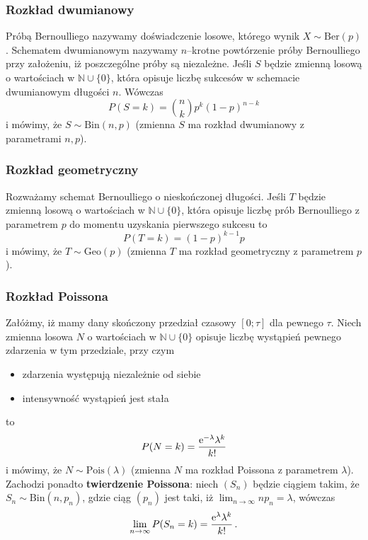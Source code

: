 \documentclass{myclass}
\begin{document}
\subsubsection{Rozkład dwumianowy}
Próbą Bernoulliego nazywamy doświadczenie losowe, którego wynik \(X \sim \text{Ber}(p)\). Schematem
dwumianowym nazywamy \(n\)--krotne powtórzenie próby Bernoulliego przy założeniu, iż poszczególne
próby są niezależne. Jeśli \(S\) będzie zmienną losową o wartościach w \(\mathbb{N} \cup \{0\}\),
która opisuje liczbę sukcesów w schemacie dwumianowym długości \(n\). Wówczas
\begin{equation*}
    P(S = k) = {n \choose k} p^k (1 - p)^{n-k}
\end{equation*}
i mówimy, że \(S \sim \text{Bin}(n, p)\) (zmienna \(S\) ma rozkład dwumianowy z parametrami \(n,
p\)).

\subsubsection{Rozkład geometryczny}
Rozważamy schemat Bernoulliego o nieskończonej długości. Jeśli \(T\) będzie zmienną losową o
wartościach w \(\mathbb{N} \cup \{0\}\), która opisuje liczbę prób Bernoulliego z parametrem \(p\)
do momentu uzyskania pierwszego sukcesu to
\begin{equation*}
    P(T=k) = (1-p)^{k-1}p
\end{equation*}
i mówimy, że \(T \sim \text{Geo}(p)\) (zmienna \(T\) ma rozkład geometryczny z parametrem \(p\)).

\subsubsection{Rozkład Poissona}
Załóżmy, iż mamy dany skończony przedział czasowy \([0; \tau]\) dla pewnego \(\tau\). Niech zmienna
losowa \(N\) o wartościach w \(\mathbb{N} \cup \{0\}\) opisuje liczbę wystąpień pewnego zdarzenia w
tym przedziale, przy czym
\begin{itemize}
    \item zdarzenia występują niezależnie od siebie
    \item intensywność wystąpień jest stała
\end{itemize}
to 
\begin{equation*}
    P(N = k) = \frac{\mathrm{e}^{-\lambda}\lambda^k}{k!}
\end{equation*}
i mówimy, że \(N \sim \text{Pois}(\lambda)\) (zmienna \(N\) ma rozkład Poissona z parametrem
\(\lambda\)). Zachodzi ponadto \textbf{twierdzenie Poissona}: niech \((S_n)\) będzie ciągiem takim,
że \(S_n \sim \text{Bin}(n, p_n)\), gdzie ciąg \((p_n)\) jest taki, iż \(\lim_{n \to \infty} np_n =
\lambda\), wówczas 
\begin{equation*}
\lim_{n\to\infty}P(S_n = k) =\frac{\mathrm{e}^\lambda\lambda^k}{k!}\,.
\end{equation*}
\end{document}
